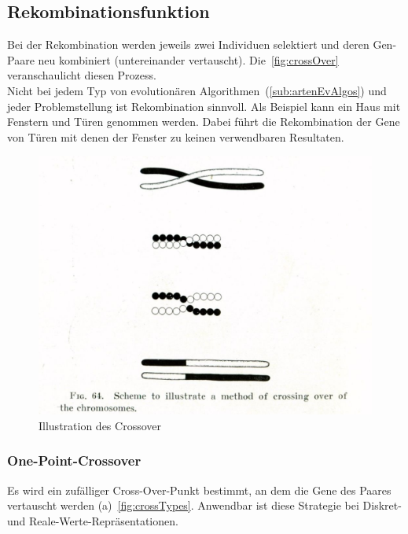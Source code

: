     \subsection{Rekombinationsfunktion}

      Bei der Rekombination werden jeweils zwei Individuen selektiert und
      deren Gen-Paare neu kombiniert (untereinander vertauscht).
      Die~\vref{fig:crossOver} veranschaulicht diesen Prozess.
      \\
      Nicht bei jedem Typ von evolutionären Algorithmen~(\vref{sub:artenEvAlgos}) und
      jeder Problemstellung ist Rekombination sinnvoll.
      Als Beispiel kann ein Haus mit Fenstern und Türen genommen werden.
      Dabei führt die Rekombination der Gene von Türen mit denen der Fenster zu keinen verwendbaren Resultaten.

      \begin{figure}[H]
        \includegraphics[scale=0.3,center]{graphics/morgan_crossover}
        \caption[\protect{}]{Illustration des Crossover\label{fig:crossOver}}
      \end{figure}

      \subsubsection{One-Point-Crossover}

        Es wird ein zufälliger Cross-Over-Punkt bestimmt, an dem die Gene des Paares vertauscht werden (a)~\vref{fig:crossTypes}.
        Anwendbar ist diese Strategie bei Diskret- und Reale-Werte-Repräsentationen.

